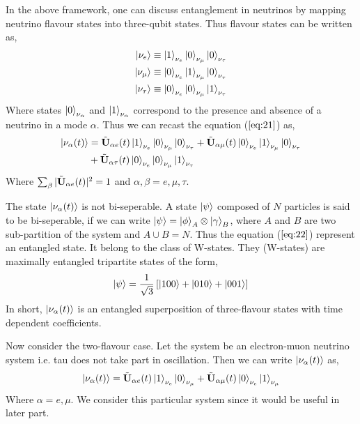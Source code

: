 \documentclass[12pt,a4paper]{report}
\begin{document}
In the above framework, one can discuss entanglement in neutrinos by mapping neutrino flavour states into three-qubit states. Thus flavour states can be written as,
\begin{equation}
\begin{split}
\ket{\nu_{e}}& \equiv \ket{1}_{\nu_{e}}\ket{0}_{\nu_{\mu}}\ket{0}_{\nu_{\tau}} \\
\ket{\nu_{\mu}}& \equiv \ket{0}_{\nu_{e}}\ket{1}_{\nu_{\mu}}\ket{0}_{\nu_{\tau}} \\
\ket{\nu_{\tau}}& \equiv \ket{0}_{\nu_{e}}\ket{0}_{\nu_{\mu}}\ket{1}_{\nu_{\tau}} \\
\end{split}
\end{equation}
Where states $\ket{0}_{\nu_{\alpha}}$ and $\ket{1}_{\nu_{\alpha}}$ correspond to the presence and absence of a neutrino in a mode $\alpha$. Thus we can recast the equation ($\ref{eq:21}$) as,
\begin{equation}
\label{eq:22}
\begin{split}
\ket{\nu_{\alpha}(t)}&=\Tilde{\textbf{U}}_{\alpha e}(t) \ket{1}_{\nu_{e}}\ket{0}_{\nu_{\mu}}\ket{0}_{\nu_{\tau}}+\Tilde{\textbf{U}}_{\alpha \mu}(t) \ket{0}_{\nu_{e}}\ket{1}_{\nu_{\mu}}\ket{0}_{\nu_{\tau}}\\
&+\Tilde{\textbf{U}}_{\alpha \tau}(t)
\ket{0}_{\nu_{e}}\ket{0}_{\nu_{\mu}}\ket{1}_{\nu_{\tau}}
\end{split}
\end{equation}
Where $\sum_{\beta}|\Tilde{\textbf{U}}_{\alpha e}(t)|^{2} = 1$ and $\alpha,\beta = e,\mu,\tau$.\par
The state $\ket{\nu_{\alpha}(t)}$ is not bi-seperable. A state $\ket{\psi}$ composed of $N$ particles is said to be bi-seperable, if we can write $\ket{\psi} = \ket{\phi}_{A}\otimes\ket{\gamma}_{B}$, where $A$ and $B$ are two sub-partition of the system and $A \cup B = N$. Thus the equation ($\ref{eq:22}$) represent an entangled state. It belong to the class of W-states. They (W-states) are maximally entangled tripartite states of the form,
\begin{equation}
\ket{\psi} = \frac{1}{\sqrt{3}}\left[ \ket{100}+\ket{010}+\ket{001}\right]
\end{equation}
In short, $\ket{\nu_{\alpha}(t)}$ is an entangled superposition of three-flavour states with time dependent coefficients.\par
Now consider the two-flavour case. Let the system be an electron-muon neutrino system i.e. tau does not take part in oscillation. Then we can write $\ket{\nu_{\alpha}(t)}$ as,
\begin{equation}
\label{eq:23}
\ket{\nu_{\alpha}(t)}=\Tilde{\textbf{U}}_{\alpha e}(t) \ket{1}_{\nu_{e}}\ket{0}_{\nu_{\mu}}+\Tilde{\textbf{U}}_{\alpha \mu}(t) \ket{0}_{\nu_{e}}\ket{1}_{\nu_{\mu}}
\end{equation}
Where $\alpha=e,\mu$. We consider this particular system since it would be useful in later part.
\end{document}
